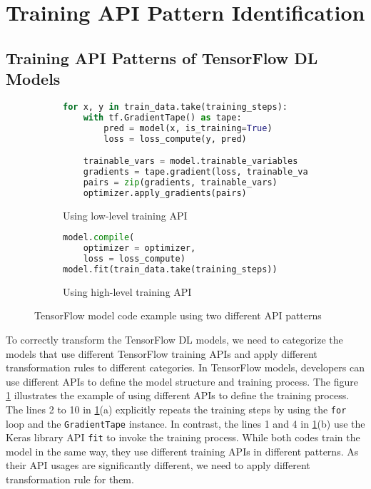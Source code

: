 \pagebreak
\section{Training API Pattern Identification}\label{sec:pattern}

\subsection{Training API Patterns of TensorFlow DL Models}

\begin{figure}[ht!]
\centering
  \begin{subfigure}[b]{\textwidth}
    \begin{lstlisting}[language=Python]
for x, y in train_data.take(training_steps):
    with tf.GradientTape() as tape:
        pred = model(x, is_training=True)
        loss = loss_compute(y, pred)

    trainable_vars = model.trainable_variables
    gradients = tape.gradient(loss, trainable_vars)
    pairs = zip(gradients, trainable_vars)
    optimizer.apply_gradients(pairs) 
    \end{lstlisting}
    \caption{Using low-level training API}
  \end{subfigure}
  \hspace{5mm}
  \begin{subfigure}[b]{\textwidth}
    \begin{lstlisting}[language=Python]
model.compile(
    optimizer = optimizer, 
    loss = loss_compute) 
model.fit(train_data.take(training_steps))
    \end{lstlisting} 
    \caption{Using high-level training API}
  \end{subfigure}

  \caption{TensorFlow model code example using two different API patterns}
  \label{fig:pattern:ex01}
\end{figure}

To correctly transform the TensorFlow DL models,
we need to categorize the models that use different TensorFlow training
APIs and apply different transformation rules to different categories.
In TensorFlow models, developers can use different APIs to define the 
model structure and training process.
The figure \ref{fig:pattern:ex01} illustrates the example of using 
different APIs to define the training process.
The lines 2 to 10 in \ref{fig:pattern:ex01}(a)  
explicitly repeats the training steps by using the {\tt for} loop
and the {\tt GradientTape} instance.
In contrast, the lines 1 and 4 in \ref{fig:pattern:ex01}(b)
use the Keras library API {\tt fit} to invoke the training process.
While both codes train the model in the same way, they use different training 
APIs in different patterns.
As their API usages are significantly different, we need to apply different
transformation rule for them.

